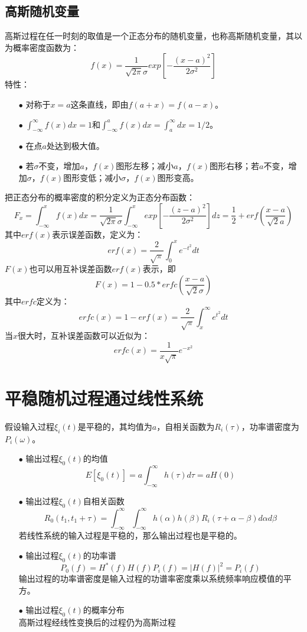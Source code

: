 \documentclass[12pt,a4paper,oneside]{ctexart}
\begin{document}
\subsection{高斯随机变量}
高斯过程在任一时刻的取值是一个正态分布的随机变量，也称高斯随机变量，其以为概率密度函数为：
$$
   f(x) = \frac{1}{\sqrt{2\pi}\sigma}exp\left[-\frac{(x-a)^{2}}{2\sigma^{2}}\right]
$$
特性：
\begin{itemize}
    \item[$\bullet$] 对称于$x=a$这条直线，即由$f(a+x) = f(a-x)$。
    \item[$\bullet$] $\int_{-\infty}^{\infty}f(x)dx = 1$和$\int_{-\infty}^{a}f(x)dx = \int_{a}^{\infty}dx = 1/2$。
    \item[$\bullet$] 在点$a$处达到极大值。
    \item[$\bullet$] 若$\sigma$不变，增加$a$，$f(x)$图形左移；减小$a$，$f(x)$图形右移；若$a$不变，增加$\sigma$，$f(x)$图形变低；减小$\sigma$，$f(x)$图形变高。
\end{itemize}
把正态分布的概率密度的积分定义为正态分布函数：
$$
    F_{x} = \int_{-\infty}^{x}f(x)dx = \frac{1}{\sqrt{2\pi}\sigma}\int_{-\infty}^{x}exp\left[-\frac{(z-a)^{2}}{2\sigma^{2}}\right]dz = \frac{1}{2} + erf(\frac{x-a}{\sqrt{2}a})
$$
其中$erf(x)$表示误差函数，定义为：
$$
    erf(x) = \frac{2}{\sqrt{\pi}}\int_{0}^{x}e^{-t^{2}}dt
$$
$F(x)$也可以用互补误差函数$erf(x)$表示，即
$$
    F(x) = 1-0.5*erfc(\frac{x-a}{\sqrt{2}\sigma})
$$
其中$erfc$定义为：
$$
    erfc(x) = 1 - erf(x) = \frac{2}{\sqrt{\pi}}\int_{x}^{\infty}e^{t^{2}}dt
$$
当$x$很大时，互补误差函数可以近似为：
$$
    erfc(x) = \frac{1}{x\sqrt{\pi}}e^{-x^{2}}
$$
\section{平稳随机过程通过线性系统}
假设输入过程$\xi_{i}(t)$是平稳的，其均值为$a$，自相关函数为$R_{i}(\tau)$，功率谱密度为$P_{i}(\omega)$。
\begin{itemize}
    \item[$\bullet$] 输出过程$\xi_{0}(t)$的均值
    $$
        E\left[\xi_{0}(t)\right] = a\int_{-\infty}^{\infty}h(\tau)d\tau = aH(0)
    $$
    \item[$\bullet$] 输出过程$\xi_{0}(t)$自相关函数
    $$
        R_{0}(t_{1},t_{1} + \tau) = \int_{-\infty}^{\infty}\int_{-\infty}^{\infty}h(\alpha)h(\beta)R_{i}(\tau + \alpha - \beta)d\alpha d\beta
    $$ 
    若线性系统的输入过程是平稳的，那么输出过程也是平稳的。
    \item[$\bullet$] 输出过程$\xi_{0}(t)$的功率谱
    $$
        P_{0}(f) = H^{*}(f)H(f)P_{i}(f) = |H(f)|^{2} = P_{i}(f)  
    $$
    输出过程的功率谱密度是输入过程的功谱率密度乘以系统频率响应模值的平方。
    \item[$\bullet$] 输出过程$\xi_{0}(t)$的概率分布\\
    高斯过程经线性变换后的过程仍为高斯过程 
\end{itemize}
\end{document}

